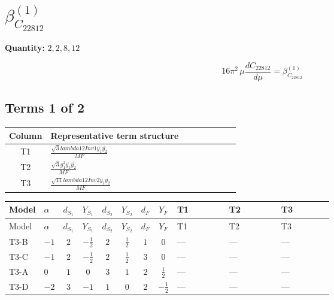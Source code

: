 \documentclass[8pt]{article}
\begin{document}
\begin{landscape}
\begin{longtable}{@{}llcccccc >{\raggedright\arraybackslash}p{0.21\linewidth} >{\raggedright\arraybackslash}p{0.21\linewidth} >{\raggedright\arraybackslash}p{0.21\linewidth}@{}}
\midrule
\bottomrule
\end{longtable}
\clearpage
\section*{$\beta_{C_{22812}}^{(1)}$}
\noindent\textbf{Quantity: }$\mathrm{2,2,8,12}$\par\smallskip
\[16\pi^2\,\mu\frac{d C_{22812}}{d\mu}=\beta_{C_{22812}}^{(1)}\]
\subsection*{Terms 1 of 2}
\begin{center}
\begin{tabular}{@{}c >{\raggedright\arraybackslash}p{0.82\linewidth}@{}}
\toprule
Column & Representative term structure \\
\midrule
T1 & \(\displaystyle \frac{\sqrt{3} lambda12Inv1 \overline{y_{1}} \overline{y_{2}}}{MF}\) \\
\midrule
T2 & \(\displaystyle \frac{\sqrt{3} g_{1}^{2} \overline{y_{1}} \overline{y_{2}}}{MF}\) \\
\midrule
T3 & \(\displaystyle \frac{\sqrt{11} lambda12Inv2 \overline{y_{1}} \overline{y_{2}}}{MF}\) \\
\midrule
\bottomrule
\end{tabular}
\end{center}
\smallskip
\tiny
\begin{longtable}{@{}llcccccc >{\raggedright\arraybackslash}p{0.21\linewidth} >{\raggedright\arraybackslash}p{0.21\linewidth} >{\raggedright\arraybackslash}p{0.21\linewidth}@{}}
\toprule
Model & $\alpha$ & $d_{S_1}$ & $Y_{S_1}$ & $d_{S_2}$ & $Y_{S_2}$ & $d_F$ & $Y_F$ & T1 & T2 & T3 \\
\midrule
\endfirsthead
\toprule
Model & $\alpha$ & $d_{S_1}$ & $Y_{S_1}$ & $d_{S_2}$ & $Y_{S_2}$ & $d_F$ & $Y_F$ & T1 & T2 & T3 \\
\midrule
\endhead
T3-B & $-1$ & $2$ & $-\frac{1}{2}$ & $2$ & $\frac{1}{2}$ & $1$ & $0$ & --- & --- & --- \\
\midrule
T3-C & $-1$ & $2$ & $-\frac{1}{2}$ & $2$ & $\frac{1}{2}$ & $3$ & $0$ & --- & --- & --- \\
\midrule
T3-A & $0$ & $1$ & $0$ & $3$ & $1$ & $2$ & $\frac{1}{2}$ & --- & --- & --- \\
\midrule
T3-D & $-2$ & $3$ & $-1$ & $1$ & $0$ & $2$ & $-\frac{1}{2}$ & --- & --- & --- \\
\midrule

\end{longtable}
\end{landscape}
\end{document}
